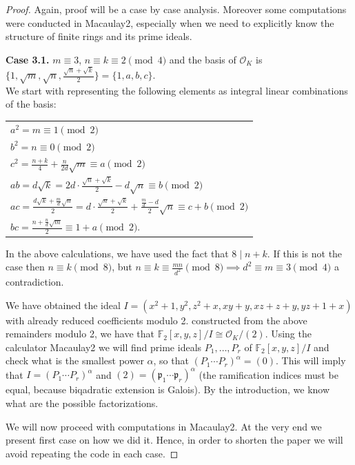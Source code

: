 \documentclass[12pt]{article}
\theoremstyle{remark}
\begin{document}
\begin{proof}
Again, proof will be a case by case analysis. Moreover some computations were conducted in Macaulay2, especially when we need to explicitly know the structure of finite rings and its prime ideals.



\textbf{Case 3.1.} $m \equiv 3$, $n \equiv k \equiv 2 \pmod{4}$ and the basis of $\mathcal{O}_K$ is $\{1, \sqrt{m}, \sqrt{n}, \frac{\sqrt{n}+\sqrt{k}}{2}\} = \{1,a,b,c\}$. \\
We start with representing the following elements as integral linear combinations of the basis:
\begin{center}
\begin{tabular}{@{}l@{}}
    $a^2 = m \equiv 1 \pmod{2}$\\
    $b^2 = n \equiv 0 \pmod{2}$\\
    $c^2 = \frac{n+k}{4} + \frac{n}{2d}\sqrt{m} \equiv a \pmod{2}$\\
    $ab = d\sqrt{k} = 2d \cdot \frac{\sqrt{n} + \sqrt{k}}{2} - d\sqrt{n} \equiv b \pmod{2}$\\
    $ac = \frac{d\sqrt{k}+ \frac{m}{d} \sqrt{n}}{2} = d \cdot \frac{\sqrt{n} + \sqrt{k}}{2} + \frac{\frac{m}{d} - d}{2} \sqrt{n} \equiv c + b \pmod{2}$\\
    $bc = \frac{n + \frac{n}{d} \sqrt{m}}{2} \equiv 1 + a \pmod{2}.$
\end{tabular}
\end{center}
In the above calculations, we have used the fact that $8 \mid n+k$. If this is not the case then $n \equiv k \pmod{8}$, but $n \equiv k \equiv \frac{mn}{d^2} \pmod{8} \implies d^2 \equiv m \equiv 3 \pmod{4} $ a contradiction. 

We have obtained the ideal $I = (x^2+1,y^2,z^2+x,xy+y,xz+z+y,yz+1+x)$ with already reduced coefficients modulo 2. constructed from the above remainders modulo 2, we have that $\mathbb{F}_2[x,y,z]/I \cong \mathcal{O}_K/(2)$. Using the calculator Macaulay2 we will find prime ideals $P_1, \dots , P_r$ of $\mathbb{F}_2[x,y,z]/I$ and check what is the smallest power $\alpha$, so that $(P_1 \cdots P_r)^{\alpha} =(0)$. This will imply that $I = (P_1 \cdots P_r)^{\alpha}$ and $(2) = (\mathfrak{p}_1 \cdots \mathfrak{p}_r)^{\alpha}$ (the ramification indices must be equal, because biqadratic extension is Galois). By the introduction, we know what are the possible factorizations.


We will now proceed with computations in Macaulay2. At the very end we present first case on how we did it. Hence, in order to shorten the paper we will avoid repeating the code in each case.


\end{proof}
\end{document}
